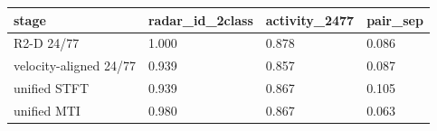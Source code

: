 \begin{tabular}{llll}
\hline
stage & radar\_id\_2class & activity\_2477 & pair\_sep \\
\hline
R2-D 24/77 & 1.000 & 0.878 & 0.086 \\
velocity-aligned 24/77 & 0.939 & 0.857 & 0.087 \\
unified STFT & 0.939 & 0.867 & 0.105 \\
unified MTI & 0.980 & 0.867 & 0.063 \\
\hline
\end{tabular}

